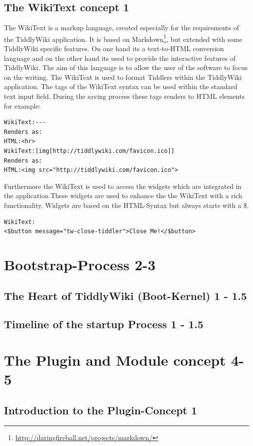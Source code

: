\documentclass[12pt,a4paper]{article}
\begin{document}
\subsection{The WikiText concept 1}
The WikiText is a markup language, created especially for the requirements of the TiddlyWiki application. It is based on Markdown\footnote{\url{http://daringfireball.net/projects/markdown/}}, but extended with some TiddlyWiki specific features.  On one hand its a text-to-HTML conversion language and on the other hand its used to provide the interactive features of TiddlyWiki. The aim of this language is to allow the user of the software to focus on the writing.\cite{TIDD:WIKITEXT} The WikiText is used to format Tiddlers within the TiddlyWiki application. The tags of the WikiText syntax can be used within the standard text input field. 
During the saving process these tags renders to HTML elements for example:
\begin{lstlisting}[caption={Example use of WikiText},label=lst:data-div]
WikiText:--- 
Renders as:
HTML:<hr>
WikiText:[img[http://tiddlywiki.com/favicon.ico]]
Renders as: 
HTML:<img src="http://tiddlywiki.com/favicon.ico">
\end{lstlisting}
Furthermore the WikiText is used to access the widgets which are integrated in the application.These widgets are used to enhance the the WikiText with a rich functionality. Widgets are based on the HTML-Syntax but always starts with a \$.
\begin{lstlisting}[caption={Example use of widgets within WikiText},label=lst:data-div]
WikiText:
<$button message="tw-close-tiddler">Close Me!</$button> 
\end{lstlisting}
\section{Bootstrap-Process 2-3}
\subsection{The Heart of TiddlyWiki (Boot-Kernel) 1 - 1.5}
\subsection{Timeline of the startup Process 1 - 1.5}

\section{The Plugin and Module concept 4-5}
\subsection{Introduction to the Plugin-Concept 1}
\end{document}
